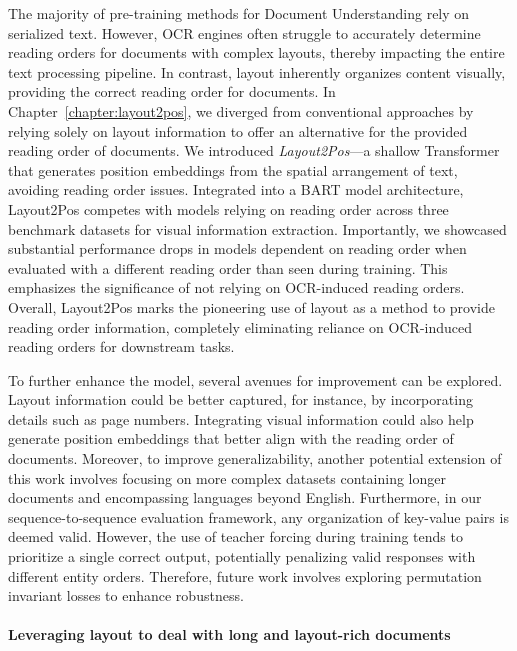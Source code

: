 The majority of pre-training methods for Document Understanding rely on serialized text. However, \ac{OCR} engines often struggle to accurately determine reading orders for documents with complex layouts, thereby impacting the entire text processing pipeline. In contrast, layout inherently organizes content visually, providing the correct reading order for documents. In Chapter~\ref{chapter:layout2pos}, we diverged from conventional approaches by relying solely on layout information to offer an alternative for the provided reading order of documents. We introduced \textit{Layout2Pos}—a shallow Transformer that generates position embeddings from the spatial arrangement of text, avoiding reading order issues. Integrated into a \ac{BART} model \citep{lewis2019bart} architecture, Layout2Pos competes with models relying on reading order across three benchmark datasets for visual information extraction. Importantly, we showcased substantial performance drops in models dependent on reading order when evaluated with a different reading order than seen during training. This emphasizes the significance of not relying on \ac{OCR}-induced reading orders. Overall, Layout2Pos marks the pioneering use of layout as a method to provide reading order information, completely eliminating reliance on \ac{OCR}-induced reading orders for downstream tasks. 

To further enhance the model, several avenues for improvement can be explored. Layout information could be better captured, for instance, by incorporating details such as page numbers. Integrating visual information could also help generate position embeddings that better align with the reading order of documents. Moreover, to improve generalizability, another potential extension of this work involves focusing on more complex datasets containing longer documents and encompassing languages beyond English. Furthermore, in our sequence-to-sequence evaluation framework, any organization of key-value pairs is deemed valid. However, the use of teacher forcing during training tends to prioritize a single correct output, potentially penalizing valid responses with different entity orders. Therefore, future work involves exploring permutation invariant losses to enhance robustness. 

\paragraph{Leveraging layout to deal with long and layout-rich documents}

